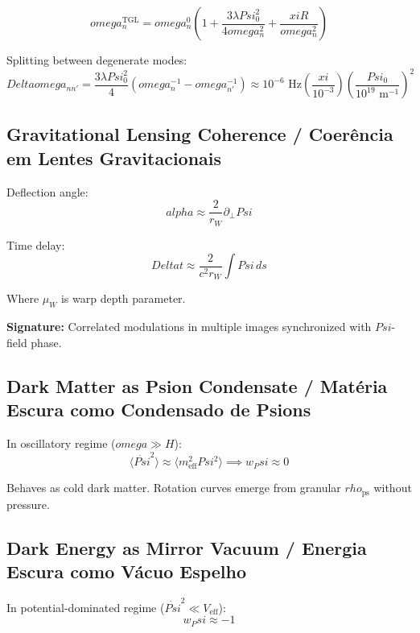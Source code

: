 \documentclass[12pt,a4paper]{article}
\def\Psi{Psi}%
\def\alpha{alpha}%
\def\xi{xi}%
\def\rho{rho}%
\def\omega{omega}%
\def\Delta{Delta}%
\begin{document}
\begin{equation}
\omega_n^{\text{TGL}} = \omega_n^0\left(1 + \frac{3\lambda\Psi_0^2}{4\omega_n^2} + \frac{\xi R}{\omega_n^2}\right)
\end{equation}

Splitting between degenerate modes:
\begin{equation}
\Delta\omega_{nn'} = \frac{3\lambda\Psi_0^2}{4}(\omega_n^{-1} - \omega_{n'}^{-1}) \approx 10^{-6}\text{ Hz}\left(\frac{\xi}{10^{-3}}\right)\left(\frac{\Psi_0}{10^{19}\text{ m}^{-1}}\right)^2
\end{equation}

\subsection{Gravitational Lensing Coherence / Coerência em Lentes Gravitacionais}

Deflection angle:
\begin{equation}
\alpha \approx \frac{2}{r_W}\partial_\perp\Psi
\end{equation}

Time delay:
\begin{equation}
\Delta t \approx \frac{2}{c^2 r_W}\int\Psi\, ds
\end{equation}

Where $\mu_W$ is warp depth parameter.

\textbf{Signature:} Correlated modulations in multiple images synchronized with $\Psi$-field phase.

\subsection{Dark Matter as Psion Condensate / Matéria Escura como Condensado de Psions}

In oscillatory regime ($\omega \gg H$):
\begin{equation}
\langle\dot{\Psi}^2\rangle \approx \langle m_{\text{eff}}^2\Psi^2\rangle \implies w_\Psi \approx 0
\end{equation}

Behaves as cold dark matter. Rotation curves emerge from granular $\rho_{\text{ps}}$ without pressure.

\subsection{Dark Energy as Mirror Vacuum / Energia Escura como Vácuo Espelho}

In potential-dominated regime ($\dot{\Psi}^2 \ll V_{\text{eff}}$):
\begin{equation}
w_\Psi \approx -1
\end{equation}
\end{document}
